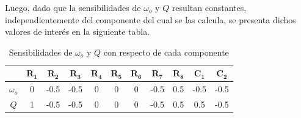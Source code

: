 Luego, dado que la sensibilidades de $\omega_o$ y $Q$ resultan constantes, independientemente del componente del cual se las calcula, se presenta dichos valores de interés en la siguiente tabla.
\begin{table}[H]
\centering
\begin{tabular}{ccccccccccc}
\hline
 & $\mathbf{R_1}$ & $\mathbf{R_2}$ & $\mathbf{R_3}$ & $\mathbf{R_4}$ & $\mathbf{R_5}$ & $\mathbf{R_6}$ & $\mathbf{R_7}$ & $\mathbf{R_8}$ & $\mathbf{C_1}$ & $\mathbf{C_2}$ \\
\hline
$\omega_o$ & 0 & -0.5 & -0.5 & 0 & 0 & 0 & -0.5 & 0.5 & -0.5 & -0.5 \\
$Q$ & 1 & -0.5 & -0.5 & 0 & 0 & 0 & -0.5 & 0.5 & 0.5 & -0.5	\\
\hline
\end{tabular}
\caption{Sensibilidades de $\omega_o$ y $Q$ con respecto de cada componente}
\end{table}

